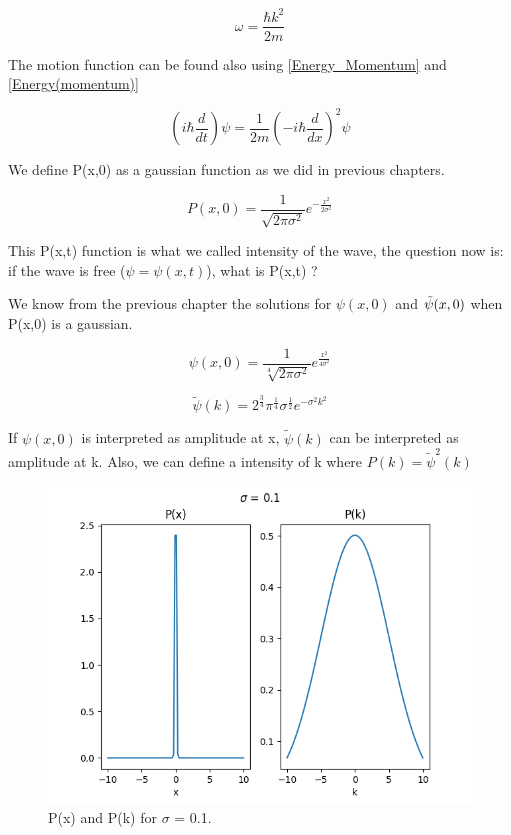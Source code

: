 \begin{equation}
    \label{2.27}
    \omega = \frac{\hbar k^2}{2m}
\end{equation}

The motion function can be found also using \ref{Energy_Momentum} and \ref{Energy(momentum)}

\begin{equation}
    \label{2.28}
    \left(i\hbar\frac{d}{dt} \right)\psi = \frac{1}{2m}\left(-i\hbar\frac{d}{dx} \right)^2 \psi
\end{equation}

We define P(x,0) as a gaussian function as we did in previous chapters.

\begin{equation}
    \label{2.29}
    P(x,0) = \frac{1}{\sqrt{2\pi\sigma^2}}e^{-\frac{x^2}{2\sigma^2}}
\end{equation}

This P(x,t) function is what we called intensity of the wave, the question now is: if the wave is free ($\psi=\psi(x,t)$), what is P(x,t) ?

We know from the previous chapter the solutions for $\psi(x,0)$ and $\Tilde{\psi}(x,0)$ when P(x,0) is a gaussian.

\begin{equation}
    \label{2.30}
    \psi(x,0) = \frac{1}{\sqrt[4]{2\pi\sigma^2}} e^{\frac{x^2}{4\sigma^2}}
\end{equation}

\begin{equation}
    \label{2.31}
    \tilde{\psi}(k) = 2^\frac{3}{4} \pi^\frac{1}{4} \sigma^\frac{1}{2} e^{-\sigma^2 k^2}
\end{equation}

If  $\psi(x,0)$ is interpreted as amplitude at x, $\tilde{\psi}(k)$ can be interpreted as amplitude at k. Also, we can define a intensity of k where $P(k) = \tilde{\psi}^2(k)$

\begin{figure}[h]
    \centering
    \includegraphics{images2/P_x&P_k_sigma=0.1.png}
    \caption{P(x) and P(k) for $\sigma$ = 0.1.}
\end{figure}

